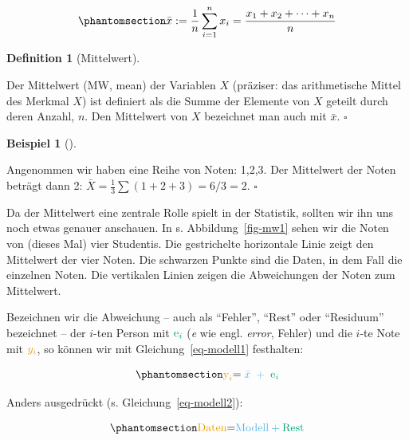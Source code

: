 \documentclass[
  letterpaper,
  oneside,
  open=any]{scrbook}
\theoremstyle{definition}
\theoremstyle{definition}
\newtheorem{example}{Beispiel}[chapter]
\theoremstyle{definition}
\newtheorem{definition}{Definition}[chapter]
\theoremstyle{remark}
\begin{document}
\begin{equation}\phantomsection\label{eq-mw-formel}{\bar {x} :=\frac{1}{n} \sum_{i=1}^{n}{x_{i}}=\frac {x_{1}+x_{2}+\dotsb +x_{n}} {n}}\end{equation}

\begin{definition}[Mittelwert]\protect\hypertarget{def-mw}{}\label{def-mw}

Der Mittelwert (MW, mean) der Variablen \(X\) (präziser: das
arithmetische Mittel des Merkmal \(X\)) ist definiert als die Summe der
Elemente von \(X\) geteilt durch deren Anzahl, \(n\). Den Mittelwert von
\(X\) bezeichnet man auch mit \(\bar {x}\). \(\square\)

\end{definition}

\begin{example}[]\protect\hypertarget{exm-mw1}{}\label{exm-mw1}

Angenommen wir haben eine Reihe von Noten: 1,2,3. Der Mittelwert der
Noten beträgt dann 2: \(\bar{X} = \frac{1}{3}\sum (1+2+3) = 6/3 = 2\).
\(\square\)

\end{example}

Da der Mittelwert eine zentrale Rolle spielt in der Statistik, sollten
wir ihn uns noch etwas genauer anschauen. In s. Abbildung~\ref{fig-mw1}
sehen wir die Noten von (dieses Mal) vier Studentis. Die gestrichelte
horizontale Linie zeigt den Mittelwert der vier Noten. Die schwarzen
Punkte sind die Daten, in dem Fall die einzelnen Noten. Die vertikalen
Linien zeigen die Abweichungen der Noten zum Mittelwert.

Bezeichnen wir die Abweichung -- auch als \enquote{Fehler},
\enquote{Rest} oder \enquote{Residuum} bezeichnet -- der \(i\)-ten
Person mit \(\color{errorcol}{\text{e}_i}\) (\emph{e} wie engl.
\emph{error}, Fehler) und die \(i\)-te Note mit \(\color{ycol}{y_i}\),
so können wir mit Gleichung~\ref{eq-modell1} festhalten:

\begin{equation}\phantomsection\label{eq-modell1}{\color{ycol}{\text{y}_i} \color{black}{ = } \color{modelcol}{\;\bar{x}\;} + \color{errorcol}{\;\text{e}_i}}\end{equation}

Anders ausgedrückt (s. Gleichung~\ref{eq-modell2}):

\begin{equation}\phantomsection\label{eq-modell2}{\color{ycol}{\text{Daten}} \color{black}{ = } \color{modelcol}{\text{Modell}} + 
\color{errorcol}{\text{Rest}}}\end{equation}
\end{document}
